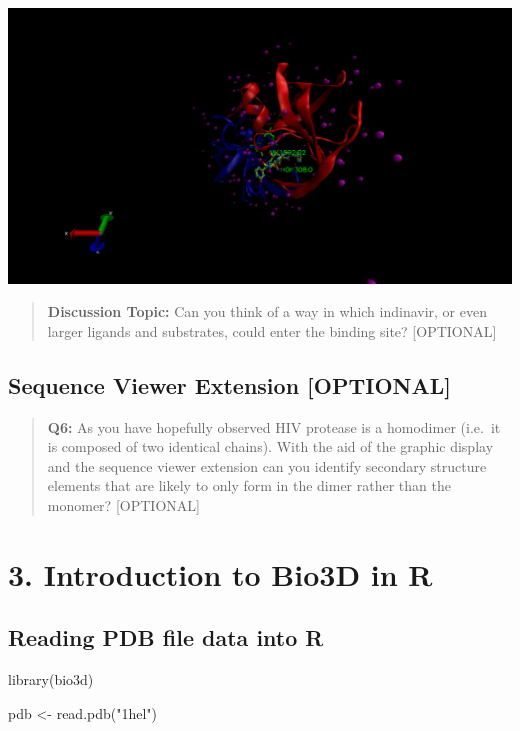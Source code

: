 \documentclass[
]{article}
\newenvironment{Shaded}{\begin{snugshade}}{\end{snugshade}}
\newcommand{\FunctionTok}[1]{\textcolor[rgb]{0.00,0.00,0.00}{#1}}
\newcommand{\NormalTok}[1]{#1}
\newcommand{\OtherTok}[1]{\textcolor[rgb]{0.56,0.35,0.01}{#1}}
\newcommand{\StringTok}[1]{\textcolor[rgb]{0.31,0.60,0.02}{#1}}
\begin{document}
\includegraphics{rendered_1hsg_image.png}

\begin{quote}
\textbf{Discussion Topic:} Can you think of a way in which indinavir, or
even larger ligands and substrates, could enter the binding site?
{[}OPTIONAL{]}
\end{quote}

\hypertarget{sequence-viewer-extension-optional}{%
\subsection{Sequence Viewer Extension
{[}OPTIONAL{]}}\label{sequence-viewer-extension-optional}}

\begin{quote}
\textbf{Q6:} As you have hopefully observed HIV protease is a homodimer
(i.e.~it is composed of two identical chains). With the aid of the
graphic display and the sequence viewer extension can you identify
secondary structure elements that are likely to only form in the dimer
rather than the monomer? {[}OPTIONAL{]}
\end{quote}

\hypertarget{introduction-to-bio3d-in-r}{%
\section{3. Introduction to Bio3D in
R}\label{introduction-to-bio3d-in-r}}

\hypertarget{reading-pdb-file-data-into-r}{%
\subsection{Reading PDB file data into
R}\label{reading-pdb-file-data-into-r}}

\begin{Shaded}
\begin{Highlighting}[]
\FunctionTok{library}\NormalTok{(bio3d)}

\NormalTok{pdb }\OtherTok{\textless{}{-}} \FunctionTok{read.pdb}\NormalTok{(}\StringTok{"1hel"}\NormalTok{)}
\end{Highlighting}
\end{Shaded}
\end{document}
